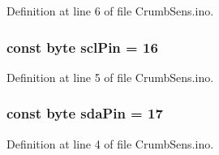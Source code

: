 Definition at line 6 of file Crumb\-Sens.\-ino.

\hypertarget{_crumb_sens_8ino_a22f7ca6ca71734a01a826f4abd36e13e}{
\subsubsection[{scl\-Pin}]{\setlength{\rightskip}{0pt plus 5cm}const byte scl\-Pin = 16}}\label{_crumb_sens_8ino_a22f7ca6ca71734a01a826f4abd36e13e}


Definition at line 5 of file Crumb\-Sens.\-ino.

\hypertarget{_crumb_sens_8ino_afa6793708eee64e6f0f328cbc61b5b22}{
\subsubsection[{sda\-Pin}]{\setlength{\rightskip}{0pt plus 5cm}const byte sda\-Pin = 17}}\label{_crumb_sens_8ino_afa6793708eee64e6f0f328cbc61b5b22}


Definition at line 4 of file Crumb\-Sens.\-ino.

